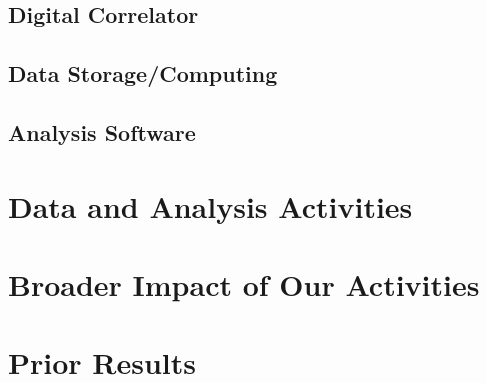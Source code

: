\documentclass[12pt]{amsart}
\begin{document}
\subsection{Digital Correlator}
\label{sec:digital_correlator}


\subsection{Data Storage/Computing}



\subsection{Analysis Software}


\section{Data and Analysis Activities}
\label{sec:analysis}



\section{Broader Impact of Our Activities}
\label{sec:broader_impacts}
\section{Prior Results}
 
\end{document}
